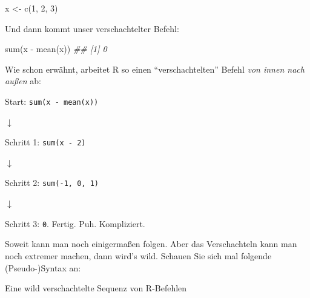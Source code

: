 \documentclass[
  letterpaper,
]{scrbook}
\newenvironment{Shaded}{\begin{snugshade}}{\end{snugshade}}
\newcommand{\DecValTok}[1]{\textcolor[rgb]{0.68,0.00,0.00}{#1}}
\newcommand{\DocumentationTok}[1]{\textcolor[rgb]{0.37,0.37,0.37}{\textit{#1}}}
\newcommand{\FunctionTok}[1]{\textcolor[rgb]{0.28,0.35,0.67}{#1}}
\newcommand{\NormalTok}[1]{\textcolor[rgb]{0.00,0.23,0.31}{#1}}
\newcommand{\OtherTok}[1]{\textcolor[rgb]{0.00,0.23,0.31}{#1}}
\newcommand{\SpecialCharTok}[1]{\textcolor[rgb]{0.37,0.37,0.37}{#1}}
\theoremstyle{definition}
\theoremstyle{definition}
\theoremstyle{definition}
\theoremstyle{remark}
\begin{document}
\begin{Shaded}
\begin{Highlighting}[]
\NormalTok{x }\OtherTok{\textless{}{-}} \FunctionTok{c}\NormalTok{(}\DecValTok{1}\NormalTok{, }\DecValTok{2}\NormalTok{, }\DecValTok{3}\NormalTok{)}
\end{Highlighting}
\end{Shaded}

Und dann kommt unser verschachtelter Befehl:

\begin{Shaded}
\begin{Highlighting}[]
\FunctionTok{sum}\NormalTok{(x }\SpecialCharTok{{-}} \FunctionTok{mean}\NormalTok{(x))}
\DocumentationTok{\#\# [1] 0}
\end{Highlighting}
\end{Shaded}

Wie schon erwähnt, arbeitet R so einen \enquote{verschachtelten} Befehl
\emph{von innen nach außen} ab:

Start: \texttt{sum(x\ -\ mean(x))}

{\(\downarrow\)}

Schritt 1: \texttt{sum(x\ -\ 2)}

{\(\downarrow\)}

Schritt 2: \texttt{sum(-1,\ 0,\ 1)}

{\(\downarrow\)}

Schritt 3: \texttt{0}. Fertig. Puh. Kompliziert.

Soweit kann man noch einigermaßen folgen. Aber das Verschachteln kann
man noch extremer machen, dann wird's wild. Schauen Sie sich mal
folgende (Pseudo-)Syntax an:

\begin{codelisting}

\caption{\label{lst-schachtel}Eine wild verschachtelte Sequenz von
R-Befehlen}

\centering{

\begin{Shaded}
\begin{Highlighting}[]
\FunctionTok{fasse\_zusammen}\NormalTok{(}
  \FunctionTok{gruppiere}\NormalTok{(}
\NormalTok{    wähle}\FunctionTok{\_spalten}\NormalTok{(}
      \FunctionTok{filter\_zeilen}\NormalTok{(meine\_daten))))}
\end{Highlighting}
\end{Shaded}

}

\end{codelisting}%
\end{document}
